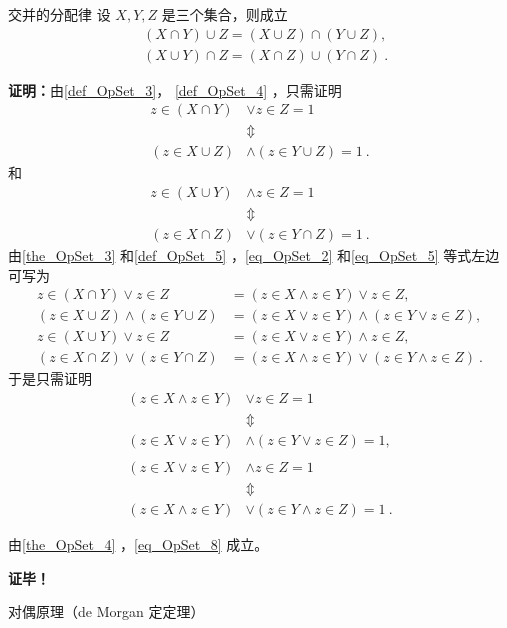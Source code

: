 \begin{theorem}{交并的分配律}
设 $X,Y,Z$ 是三个集合，则成立
\begin{equation}
\begin{aligned}
&(X\cap Y)\cup Z=(X\cup Z)\cap (Y\cup Z),\\
&(X\cup Y)\cap Z=(X\cap Z)\cup (Y\cap Z)~.
\end{aligned}
\end{equation}
\end{theorem}
\textbf{证明：}由\autoref{def_OpSet_3}， \autoref{def_OpSet_4} ，只需证明
\begin{equation}\label{eq_OpSet_2}
\begin{aligned}
z\in (X\cap Y)&\lor z\in Z=1\\
&\Updownarrow\\
 (z\in X\cup Z)&\land (z\in Y\cup Z)=1~.
 \end{aligned}
 \end{equation}
 和 
 \begin{equation}\label{eq_OpSet_5}
\begin{aligned}
z\in (X\cup Y)&\land z\in Z=1\\
&\Updownarrow\\
 (z\in X\cap Z)&\lor (z\in Y\cap Z)=1~.
 \end{aligned}
 \end{equation}
由\autoref{the_OpSet_3} 和\autoref{def_OpSet_5} ，\autoref{eq_OpSet_2}  和\autoref{eq_OpSet_5} 等式左边可写为
\begin{equation}
\begin{aligned}
z\in (X\cap Y)\lor z\in Z&=(z\in X\land z\in Y)\lor z\in Z,\\
(z\in X\cup Z)\land (z\in Y\cup Z)&=(z\in X\lor z\in Y)\land (z\in Y\lor z\in Z),\\
z\in (X\cup Y)\lor z\in Z&=(z\in X\lor z\in Y)\land z\in Z,\\
(z\in X\cap Z)\lor (z\in Y\cap Z)&=(z\in X\land z\in Y)\lor (z\in Y\land z\in Z)~.
\end{aligned}
\end{equation}
于是只需证明 
\begin{equation}\label{eq_OpSet_8}
\begin{aligned}
(z\in X\land z\in Y)&\lor z\in Z=1\\
&\Updownarrow\\
(z\in X\lor z\in Y)&\land (z\in Y\lor z\in Z)=1,\\
\\
(z\in X\lor z\in Y)&\land z\in Z=1\\
&\Updownarrow\\
(z\in X\land z\in Y)&\lor (z\in Y\land z\in Z)=1~.
\end{aligned}
\end{equation}

由\autoref{the_OpSet_4} ，\autoref{eq_OpSet_8} 成立。

\textbf{证毕！}
\begin{theorem}{对偶原理（de Morgan 定定理）}

\end{theorem}